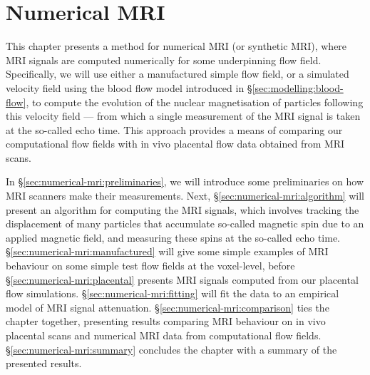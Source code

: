 \chapter{Numerical MRI} \label{sec:numerical-mri}

    This chapter presents a method for numerical MRI (or synthetic MRI), where MRI signals are computed numerically for some underpinning flow field. Specifically, we will use either a manufactured simple flow field, or a simulated velocity field using the blood flow model introduced in \S\ref{sec:modelling:blood-flow}, to compute the evolution of the nuclear magnetisation of particles following this velocity field --- from which a single measurement of the MRI signal is taken at the so-called echo time. This approach provides a means of comparing our computational flow fields with in vivo placental flow data obtained from MRI scans.
    
    In \S\ref{sec:numerical-mri:preliminaries}, we will introduce some preliminaries on how MRI scanners make their measurements. Next, \S\ref{sec:numerical-mri:algorithm} will present an algorithm for computing the MRI signals, which involves tracking the displacement of many particles that accumulate so-called magnetic spin due to an applied magnetic field, and measuring these spins at the so-called echo time. \S\ref{sec:numerical-mri:manufactured} will give some simple examples of MRI behaviour on some simple test flow fields at the voxel-level, before \S\ref{sec:numerical-mri:placental} presents MRI signals computed from our placental flow simulations. \S\ref{sec:numerical-mri:fitting} will fit the data to an empirical model of MRI signal attenuation. \S\ref{sec:numerical-mri:comparison} ties the chapter together, presenting results comparing MRI behaviour on in vivo placental scans and numerical MRI data from computational flow fields. \S\ref{sec:numerical-mri:summary} concludes the chapter with a summary of the presented results.


